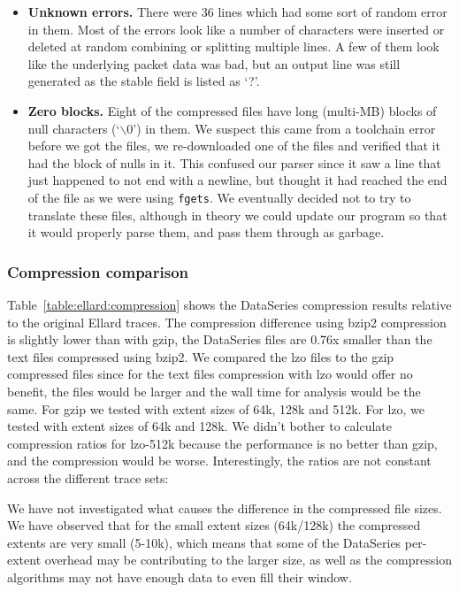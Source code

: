 \documentclass[twocolumn, 11pt]{article}
\begin{document}
\begin{itemize}
\item {\bf Unknown errors.} There were 36 lines which had some sort of
random error in them.  Most of the errors look like a number of
characters were inserted or deleted at random combining or splitting
multiple lines.  A few of them look like the underlying packet data
was bad, but an output line was still generated as the stable field is
listed as `?'.

\item {\bf Zero blocks.} Eight of the compressed files have long
(multi-MB) blocks of null characters (`$\backslash0$') in them.  We
suspect this came from a toolchain error before we got the files, we
re-downloaded one of the files and verified that it had the block of
nulls in it.  This confused our parser since it saw a line that just
happened to not end with a newline, but thought it had reached the end
of the file as we were using \texttt{fgets}.  We eventually decided
not to try to translate these files, although in theory we could
update our program so that it would properly parse them, and pass them
through as garbage.

\end{itemize}

\subsubsection{Compression comparison}

Table~\ref{table:ellard:compression} shows the DataSeries compression results
relative to the original Ellard traces.  The compression difference
using bzip2 compression is slightly lower than with gzip, the
DataSeries files are 0.76x smaller than the text files compressed
using bzip2.  We compared the lzo files to the gzip compressed files
since for the text files compression with lzo would offer no benefit,
the files would be larger and the wall time for analysis would be the
same.  For gzip we tested with extent sizes of 64k, 128k and 512k.
For lzo, we tested with extent sizes of 64k and 128k.  We didn't
bother to calculate compression ratios for lzo-512k because the
performance is no better than gzip, and the compression would be
worse.  Interestingly, the ratios are not constant across the
different trace sets:

We have not investigated what causes the difference in the compressed
file sizes.  We have observed that for the small extent sizes
(64k/128k) the compressed extents are very small (5-10k), which means
that some of the DataSeries per-extent overhead may be contributing to
the larger size, as well as the compression algorithms may not have
enough data to even fill their window.
\end{document}
